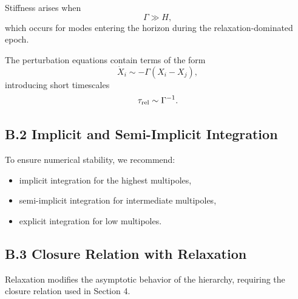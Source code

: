\documentclass[11pt,a4paper]{article}
\begin{document}
Stiffness arises when
\begin{equation}
\Gamma \gg H,
\end{equation}
which occurs for modes entering the horizon during the relaxation-dominated epoch.

The perturbation equations contain terms of the form
\begin{equation}
\dot{X}_i \sim -\Gamma(X_i - X_j),
\end{equation}
introducing short timescales
\begin{equation}
\tau_{\rm rel} \sim \Gamma^{-1}.
\end{equation}

\subsection*{B.2 Implicit and Semi-Implicit Integration}

To ensure numerical stability, we recommend:

\begin{itemize}
\item implicit integration for the highest multipoles,
\item semi-implicit integration for intermediate multipoles,
\item explicit integration for low multipoles.
\end{itemize}

\subsection*{B.3 Closure Relation with Relaxation}

Relaxation modifies the asymptotic behavior of the hierarchy, requiring the closure relation used in Section 4.
\end{document}
